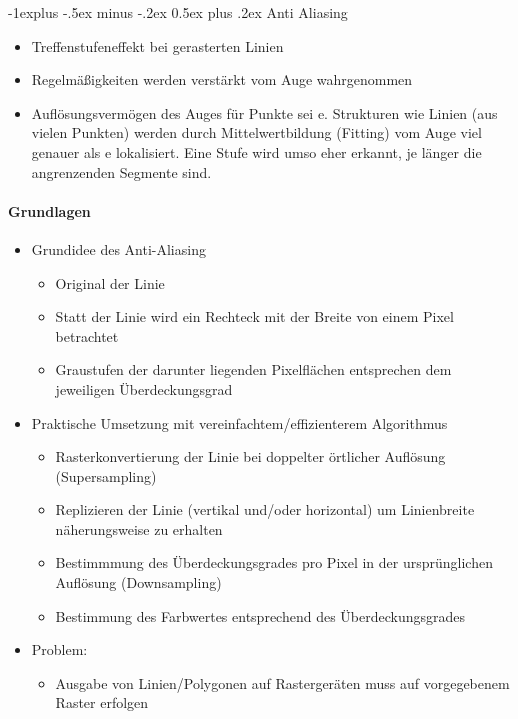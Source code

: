 \documentclass[10pt,landscape]{article}
\makeatletter
\renewcommand{\subsection}{\@startsection{subsection}{2}{0mm}%
                                {-1explus -.5ex minus -.2ex}%
                                {0.5ex plus .2ex}%
                                {\normalfont\normalsize\bfseries}}
\makeatother
\begin{document}
\begin{multicols}{3}
\subsection{Anti Aliasing}
\begin{itemize}
  \item Treffenstufeneffekt bei gerasterten Linien
  \item Regelmäßigkeiten werden verstärkt vom Auge wahrgenommen
  \item Auflösungsvermögen des Auges für Punkte sei e. Strukturen wie Linien (aus vielen Punkten) werden durch Mittelwertbildung (Fitting) vom Auge viel genauer als e lokalisiert. Eine Stufe wird umso eher erkannt, je länger die angrenzenden Segmente sind.
\end{itemize}

\paragraph{Grundlagen}
\begin{itemize}
  \item Grundidee des Anti-Aliasing
        \begin{itemize}
          \item Original der Linie
          \item Statt der Linie wird ein Rechteck mit der Breite von einem Pixel betrachtet
          \item Graustufen der darunter liegenden Pixelflächen entsprechen dem jeweiligen Überdeckungsgrad
        \end{itemize}
  \item Praktische Umsetzung mit vereinfachtem/effizienterem Algorithmus
        \begin{itemize}
          \item Rasterkonvertierung der Linie bei doppelter örtlicher Auflösung (Supersampling)
          \item Replizieren der Linie (vertikal und/oder horizontal) um Linienbreite näherungsweise zu erhalten
          \item Bestimmmung des Überdeckungsgrades pro Pixel in der ursprünglichen Auflösung (Downsampling)
          \item Bestimmung des Farbwertes entsprechend des Überdeckungsgrades
        \end{itemize}
  \item Problem:
        \begin{itemize}
          \item Ausgabe von Linien/Polygonen auf Rastergeräten muss auf vorgegebenem Raster erfolgen

\end{itemize}
\end{itemize}
\end{multicols}
\end{document}
